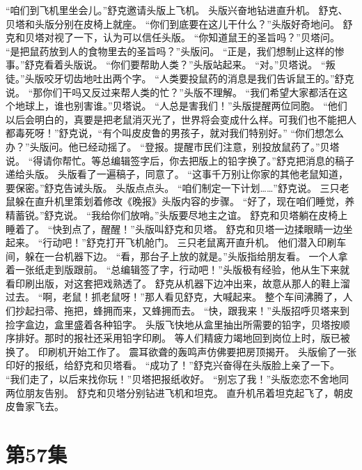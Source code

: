 \documentclass[a4paper,12pt,UTF8,twoside]{ctexbook}
\begin{document}
        “咱们到飞机里坐会儿。”舒克邀请头版上飞机。 
        头版兴奋地钻进直升机。 
        舒克、贝塔和头版分别在皮椅上就座。 
        “你们到底要在这儿干什么？”头版好奇地问。 
        舒克和贝塔对视了一下，认为可以信任头版。 
        “你知道鼠王的圣旨吗？”贝塔问。 
        “是把鼠药放到人的食物里去的圣旨吗？”头版问。 
        “正是，我们想制止这样的惨事。”舒克看着头版说。 
        “你们要帮助人类？”头版站起来。 
        “对。”贝塔说。 
        “叛徒。”头版咬牙切齿地吐出两个字。 
        “人类要投鼠药的消息是我们告诉鼠王的。”舒克说。 
        “那你们干吗又反过来帮人类的忙？”头版不理解。 
        “我们希望大家都活在这个地球上，谁也别害谁。”贝塔说。 
        “人总是害我们！”头版提醒两位同胞。 
        “他们以后会明白的，真要是把老鼠消灭光了，世界将会变成什么样。可我们也不能把人都毒死呀！”舒克说，“有个叫皮皮鲁的男孩子，就对我们特别好。” 
        “你们想怎么办？”头版问。他已经动摇了。 
        “登报。提醒市民们注意，别投放鼠药了。”贝塔说。 
        “得请你帮忙。等总编辑签字后，你去把版上的铅字换了。”舒克把消息的稿子递给头版。 
        头版看了一遍稿子，同意了。 
        “这事千万别让你家的其他老鼠知道，要保密。”舒克告诫头版。 
        头版点点头。 
        “咱们制定一下计划……”舒克说。 
        三只老鼠躲在直升机里策划着修改《晚报》头版内容的步骤。 
        “好了，现在咱们睡觉，养精蓄锐。”舒克说。 
        “我给你们放哨。”头版要尽地主之谊。 
        舒克和贝塔躺在皮椅上睡着了。 
        “快到点了，醒醒！”头版叫舒克和贝塔。 
        舒克和贝塔一边揉眼睛一边坐起来。 
        “行动吧！”舒克打开飞机舱门。 
        三只老鼠离开直升机。 
        他们潜入印刷车间，躲在一台机器下边。 
        “看，那台子上放的就是。”头版指给朋友看。 
        一个人拿着一张纸走到版跟前。 
        “总编辑签了字，行动吧！”头版极有经验，他从生下来就看印刷出版，对这套把戏熟透了。 
        舒克从机器下边冲出来，故意从那人的鞋上溜过去。 
        “啊，老鼠！抓老鼠呀！”那人看见舒克，大喊起来。 
        整个车间沸腾了，人们抄起扫帚、拖把，蜂拥而来，又蜂拥而去。 
        “快，跟我来！”头版招呼贝塔来到捡字盒边，盒里盛着各种铅字。 
        头版飞快地从盒里抽出所需要的铅字，贝塔按顺序排好。那时的报社还采用铅字印刷。 
        等人们精疲力竭地回到岗位上时，版已被换了。 
        印刷机开始工作了。 
        震耳欲聋的轰鸣声仿佛要把房顶揭开。 
        头版偷了一张印好的报纸，给舒克和贝塔看。 
        “成功了！”舒克兴奋得在头版脸上亲了一下。 
        “我们走了，以后来找你玩！”贝塔把报纸收好。 
        “别忘了我！”头版恋恋不舍地同两位朋友告别。 
        舒克和贝塔分别钻进飞机和坦克。 
        直升机吊着坦克起飞了，朝皮皮鲁家飞去。   \chapter{第57集} 
\end{document}
